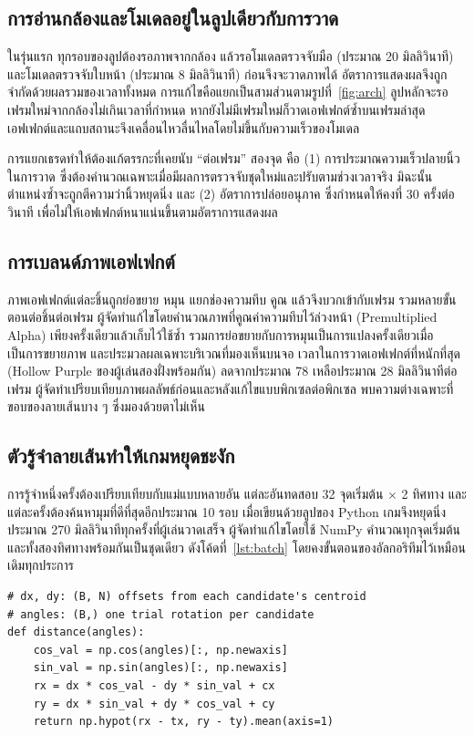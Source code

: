 \documentclass[12pt,a4paper]{report}
\begin{document}
\subsection{การอ่านกล้องและโมเดลอยู่ในลูปเดียวกับการวาด}
ในรุ่นแรก ทุกรอบของลูปต้องรอภาพจากกล้อง แล้วรอโมเดลตรวจจับมือ (ประมาณ 20 มิลลิวินาที) และโมเดลตรวจจับใบหน้า (ประมาณ 8 มิลลิวินาที)
ก่อนจึงจะวาดภาพได้ อัตราการแสดงผลจึงถูกจำกัดด้วยผลรวมของเวลาทั้งหมด การแก้ไขคือแยกเป็นสามส่วนตามรูปที่~\ref{fig:arch}
ลูปหลักจะรอเฟรมใหม่จากกล้องไม่เกินเวลาที่กำหนด หากยังไม่มีเฟรมใหม่ก็วาดเอฟเฟกต์ซ้ำบนเฟรมล่าสุด
เอฟเฟกต์และแถบสถานะจึงเคลื่อนไหวลื่นไหลโดยไม่ขึ้นกับความเร็วของโมเดล

การแยกเธรดทำให้ต้องแก้ตรรกะที่เคยนับ ``ต่อเฟรม'' สองจุด คือ (1) การประมาณความเร็วปลายนิ้วในการวาด
ซึ่งต้องคำนวณเฉพาะเมื่อมีผลการตรวจจับชุดใหม่และปรับตามช่วงเวลาจริง มิฉะนั้นตำแหน่งซ้ำจะถูกตีความว่านิ้วหยุดนิ่ง
และ (2) อัตราการปล่อยอนุภาค ซึ่งกำหนดให้คงที่ 30 ครั้งต่อวินาที เพื่อไม่ให้เอฟเฟกต์หนาแน่นขึ้นตามอัตราการแสดงผล

\subsection{การเบลนด์ภาพเอฟเฟกต์}
ภาพเอฟเฟกต์แต่ละชิ้นถูกย่อขยาย หมุน แยกช่องความทึบ คูณ แล้วจึงบวกเข้ากับเฟรม รวมหลายขั้นตอนต่อชิ้นต่อเฟรม
ผู้จัดทำแก้ไขโดยคำนวณภาพที่คูณค่าความทึบไว้ล่วงหน้า (Premultiplied Alpha) เพียงครั้งเดียวแล้วเก็บไว้ใช้ซ้ำ
รวมการย่อขยายกับการหมุนเป็นการแปลงครั้งเดียวเมื่อเป็นการขยายภาพ และประมวลผลเฉพาะบริเวณที่มองเห็นบนจอ
เวลาในการวาดเอฟเฟกต์ที่หนักที่สุด (Hollow Purple ของผู้เล่นสองฝั่งพร้อมกัน) ลดจากประมาณ 78 เหลือประมาณ 28 มิลลิวินาทีต่อเฟรม
ผู้จัดทำเปรียบเทียบภาพผลลัพธ์ก่อนและหลังแก้ไขแบบพิกเซลต่อพิกเซล พบความต่างเฉพาะที่ขอบของลายเส้นบาง ๆ ซึ่งมองด้วยตาไม่เห็น

\subsection{ตัวรู้จำลายเส้นทำให้เกมหยุดชะงัก}
การรู้จำหนึ่งครั้งต้องเปรียบเทียบกับแม่แบบหลายอัน แต่ละอันทดสอบ 32 จุดเริ่มต้น $\times$ 2 ทิศทาง
และแต่ละครั้งต้องค้นหามุมที่ดีที่สุดอีกประมาณ 10 รอบ เมื่อเขียนด้วยลูปของ Python เกมจึงหยุดนิ่งประมาณ 270 มิลลิวินาทีทุกครั้งที่ผู้เล่นวาดเสร็จ
ผู้จัดทำแก้ไขโดยใช้ NumPy คำนวณทุกจุดเริ่มต้นและทั้งสองทิศทางพร้อมกันเป็นชุดเดียว ดังโค้ดที่~\ref{lst:batch}
โดยคงขั้นตอนของอัลกอริทึมไว้เหมือนเดิมทุกประการ

\begin{lstlisting}[caption={ฟังก์ชันระยะห่างที่คำนวณลายเส้นหลายชุดพร้อมกัน (ย่อจาก unistroke.py)}, label={lst:batch}]
# dx, dy: (B, N) offsets from each candidate's centroid
# angles: (B,) one trial rotation per candidate
def distance(angles):
    cos_val = np.cos(angles)[:, np.newaxis]
    sin_val = np.sin(angles)[:, np.newaxis]
    rx = dx * cos_val - dy * sin_val + cx
    ry = dx * sin_val + dy * cos_val + cy
    return np.hypot(rx - tx, ry - ty).mean(axis=1)
\end{lstlisting}
\end{document}

